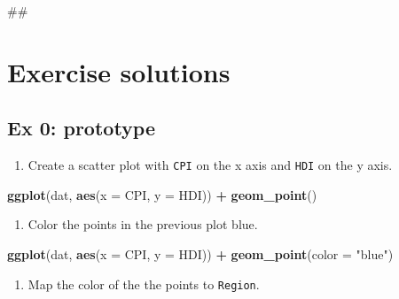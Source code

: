 \documentclass[]{book}
\newenvironment{Shaded}{\begin{snugshade}}{\end{snugshade}}
\newcommand{\KeywordTok}[1]{\textcolor[rgb]{0.13,0.29,0.53}{\textbf{#1}}}
\newcommand{\DataTypeTok}[1]{\textcolor[rgb]{0.13,0.29,0.53}{#1}}
\newcommand{\StringTok}[1]{\textcolor[rgb]{0.31,0.60,0.02}{#1}}
\newcommand{\OperatorTok}[1]{\textcolor[rgb]{0.81,0.36,0.00}{\textbf{#1}}}
\newcommand{\NormalTok}[1]{#1}
\providecommand{\tightlist}{%
  \setlength{\itemsep}{0pt}\setlength{\parskip}{0pt}}
\begin{document}
\begin{Shaded}
\begin{Highlighting}[]
\NormalTok{## }
\end{Highlighting}
\end{Shaded}

\section{Exercise solutions}\label{exercise-solutions-2}

\subsection{Ex 0: prototype}\label{ex-0-prototype-2}

\begin{enumerate}
\def\labelenumi{\arabic{enumi}.}
\tightlist
\item
  Create a scatter plot with \texttt{CPI} on the x axis and \texttt{HDI}
  on the y axis.
\end{enumerate}

\begin{Shaded}
\begin{Highlighting}[]
\KeywordTok{ggplot}\NormalTok{(dat, }\KeywordTok{aes}\NormalTok{(}\DataTypeTok{x =}\NormalTok{ CPI, }\DataTypeTok{y =}\NormalTok{ HDI)) }\OperatorTok{+}
\StringTok{  }\KeywordTok{geom_point}\NormalTok{()}
\end{Highlighting}
\end{Shaded}

\begin{enumerate}
\def\labelenumi{\arabic{enumi}.}
\setcounter{enumi}{1}
\tightlist
\item
  Color the points in the previous plot blue.
\end{enumerate}

\begin{Shaded}
\begin{Highlighting}[]
\KeywordTok{ggplot}\NormalTok{(dat, }\KeywordTok{aes}\NormalTok{(}\DataTypeTok{x =}\NormalTok{ CPI, }\DataTypeTok{y =}\NormalTok{ HDI)) }\OperatorTok{+}
\StringTok{  }\KeywordTok{geom_point}\NormalTok{(}\DataTypeTok{color =} \StringTok{"blue"}\NormalTok{)}
\end{Highlighting}
\end{Shaded}

\begin{enumerate}
\def\labelenumi{\arabic{enumi}.}
\setcounter{enumi}{2}
\tightlist
\item
  Map the color of the the points to \texttt{Region}.
\end{enumerate}
\end{document}
